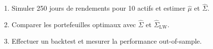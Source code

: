 \begin{exercice}
\begin{enumerate}
    \item Simuler 250 jours de rendements pour 10 actifs et estimer
          $\hat{\mu}$ et $\hat{\Sigma}$.
    \item Comparer les portefeuilles optimaux avec $\hat{\Sigma}$ et
          $\hat{\Sigma}_{\text{LW}}$.
    \item Effectuer un backtest et mesurer la performance out-of-sample.
\end{enumerate}
\end{exercice}
